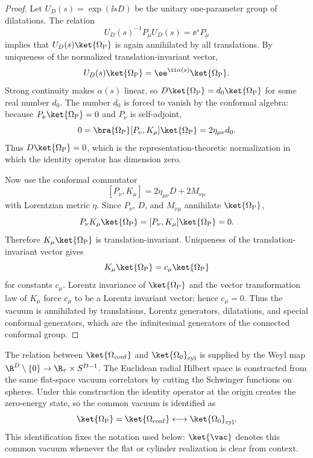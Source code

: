 \begin{proof}
Let \(U_D(s)=\exp(\ii sD)\) be the unitary one-parameter group of dilatations.
The relation
\[
  U_D(s)^{-1}P_\mu U_D(s)=\ee^sP_\mu
\]
implies that \(U_D(s)\ket{\Omega_{\rm P}}\) is again annihilated by all
translations.  By uniqueness of the normalized translation-invariant vector,
\[
  U_D(s)\ket{\Omega_{\rm P}}=\ee^{\ii\alpha(s)}\ket{\Omega_{\rm P}} .
\]
Strong continuity makes \(\alpha(s)\) linear, so
\(D\ket{\Omega_{\rm P}}=d_0\ket{\Omega_{\rm P}}\) for some real number
\(d_0\).  The number \(d_0\) is forced to vanish by the conformal algebra:
because \(P_\nu\ket{\Omega_{\rm P}}=0\) and \(P_\nu\) is self-adjoint,
\[
  0
  =
  \bra{\Omega_{\rm P}}[P_\nu,K_\mu]\ket{\Omega_{\rm P}}
  =
  2\eta_{\mu\nu}d_0 .
\]
Thus \(D\ket{\Omega_{\rm P}}=0\), which is the representation-theoretic
normalization in which the identity operator has dimension zero.

Now use the conformal commutator
\[
  [P_\nu,K_\mu]=2\eta_{\mu\nu}D+2M_{\nu\mu}
\]
with Lorentzian metric \(\eta\).  Since \(P_\nu\), \(D\), and \(M_{\nu\mu}\)
annihilate \(\ket{\Omega_{\rm P}}\),
\[
  P_\nu K_\mu\ket{\Omega_{\rm P}}
  =
  [P_\nu,K_\mu]\ket{\Omega_{\rm P}}
  =
  0 .
\]
Therefore \(K_\mu\ket{\Omega_{\rm P}}\) is translation-invariant.  Uniqueness
of the translation-invariant vector gives
\[
  K_\mu\ket{\Omega_{\rm P}}=c_\mu\ket{\Omega_{\rm P}}
\]
for constants \(c_\mu\).  Lorentz invariance of \(\ket{\Omega_{\rm P}}\) and
the vector transformation law of \(K_\mu\) force \(c_\mu\) to be a Lorentz
invariant vector; hence \(c_\mu=0\).  Thus the vacuum is annihilated by
translations, Lorentz generators, dilatations, and special conformal
generators, which are the infinitesimal generators of the connected conformal
group.
\end{proof}

The relation between \(\ket{\Omega_{\rm conf}}\) and
\(\ket{\Omega_0}_{\rm cyl}\) is supplied by the Weyl map
\(\R^D\setminus\{0\}\to\R_\tau\times S^{D-1}\).  The Euclidean radial Hilbert
space is constructed from the same flat-space vacuum correlators by cutting
the Schwinger functions on spheres.  Under this construction the identity
operator at the origin creates the zero-energy state, so the common vacuum is
identified as
\[
  \ket{\Omega_{\rm P}}
  =
  \ket{\Omega_{\rm conf}}
  \longleftrightarrow
  \ket{\Omega_0}_{\rm cyl}.
\]
This identification fixes the notation used below: \(\ket{\vac}\) denotes this
common vacuum whenever the flat or cylinder realization is clear from context.

